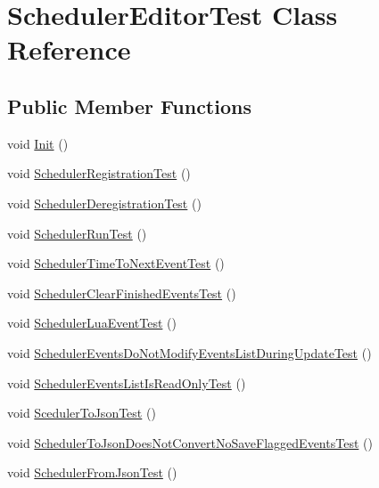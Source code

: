 \hypertarget{class_scheduler_editor_test}{}\section{Scheduler\+Editor\+Test Class Reference}
\label{class_scheduler_editor_test}
\subsection*{Public Member Functions}
\begin{DoxyCompactItemize}
\item 
void \hyperlink{class_scheduler_editor_test_a539846d1d61db5315c4a9c7db6495f5f}{Init} ()
\item 
void \hyperlink{class_scheduler_editor_test_a2162084ef8c28e356bed4374cbea50bb}{Scheduler\+Registration\+Test} ()
\item 
void \hyperlink{class_scheduler_editor_test_a146364bf766fb03e8525072455e2515d}{Scheduler\+Deregistration\+Test} ()
\item 
void \hyperlink{class_scheduler_editor_test_ac6c7313562c1ce4f9e6328a41dd9bbb4}{Scheduler\+Run\+Test} ()
\item 
void \hyperlink{class_scheduler_editor_test_ac42929cff725a4351a4dc54b6fcf05cb}{Scheduler\+Time\+To\+Next\+Event\+Test} ()
\item 
void \hyperlink{class_scheduler_editor_test_a4c8e9bfb7c2fae50b5070843f3013004}{Scheduler\+Clear\+Finished\+Events\+Test} ()
\item 
void \hyperlink{class_scheduler_editor_test_ac6b56ce0eee1b96100d737774abda5eb}{Scheduler\+Lua\+Event\+Test} ()
\item 
void \hyperlink{class_scheduler_editor_test_a362e86415c4e22b78d3114c631377231}{Scheduler\+Events\+Do\+Not\+Modify\+Events\+List\+During\+Update\+Test} ()
\item 
void \hyperlink{class_scheduler_editor_test_a0cd8299f65a2c2d5f89026184766eda8}{Scheduler\+Events\+List\+Is\+Read\+Only\+Test} ()
\item 
void \hyperlink{class_scheduler_editor_test_add807e45232b34ec6e62b421bf23f2ca}{Sceduler\+To\+Json\+Test} ()
\item 
void \hyperlink{class_scheduler_editor_test_a9307ec4d249726c96f46cfdfaa19c2b7}{Scheduler\+To\+Json\+Does\+Not\+Convert\+No\+Save\+Flagged\+Events\+Test} ()
\item 
void \hyperlink{class_scheduler_editor_test_ae88487ca433e8eb0231eff3911f95e88}{Scheduler\+From\+Json\+Test} ()
\end{DoxyCompactItemize}



